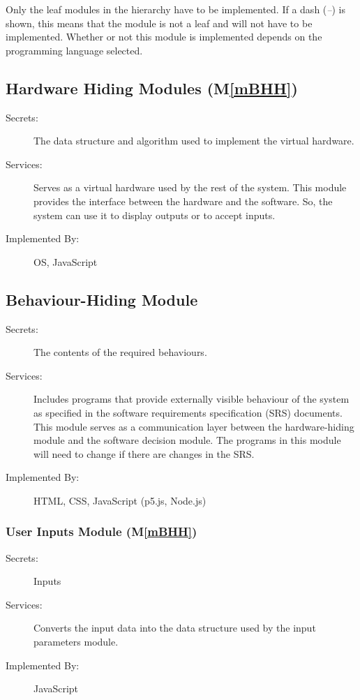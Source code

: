 \documentclass[12pt, titlepage]{article}
\newcommand{\mref}[1]{M\ref{#1}}
\begin{document}
Only the leaf modules in the
hierarchy have to be implemented. If a dash (\emph{--}) is shown, this means
that the module is not a leaf and will not have to be implemented. Whether or
not this module is implemented depends on the programming language
selected.

\subsection{Hardware Hiding Modules (\mref{mBHH})}

\begin{description}
\item[Secrets:]The data structure and algorithm used to implement the virtual
  hardware.
\item[Services:]Serves as a virtual hardware used by the rest of the
  system. This module provides the interface between the hardware and the
  software. So, the system can use it to display outputs or to accept inputs.
\item[Implemented By:] OS, JavaScript
\end{description}

\subsection{Behaviour-Hiding Module}

\begin{description}
\item[Secrets:]The contents of the required behaviours.
\item[Services:]Includes programs that provide externally visible behaviour of
  the system as specified in the software requirements specification (SRS)
  documents. This module serves as a communication layer between the
  hardware-hiding module and the software decision module. The programs in this
  module will need to change if there are changes in the SRS.
\item[Implemented By:] HTML, CSS, JavaScript (p5.js, Node.js)
\end{description}
\subsubsection{User Inputs Module (\mref{mBHH})}
\begin{description}
\item[Secrets:]Inputs
\item[Services:]Converts the input data into the data structure used by the
  input parameters module.
\item[Implemented By:] JavaScript
\end{description}
\end{document}
